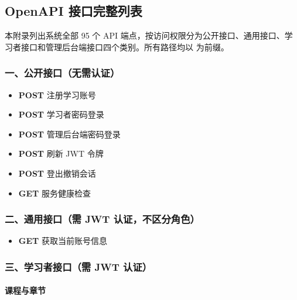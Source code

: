 \begin{appendices}
\chapter{OpenAPI 接口完整列表}

本附录列出系统全部 95 个 API 端点，按访问权限分为公开接口、通用接口、学习者接口和管理后台端接口四个类别。所有路径均以  为前缀。

\subsection*{一、公开接口（无需认证）}

\begin{itemize}
  \item \textbf{POST}  \hfill 注册学习账号
  \item \textbf{POST}  \hfill 学习者密码登录
  \item \textbf{POST}  \hfill 管理后台端密码登录
  \item \textbf{POST}  \hfill 刷新 JWT 令牌
  \item \textbf{POST}  \hfill 登出撤销会话
  \item \textbf{GET}  \hfill 服务健康检查
\end{itemize}

\subsection*{二、通用接口（需 JWT 认证，不区分角色）}

\begin{itemize}
  \item \textbf{GET}  \hfill 获取当前账号信息
\end{itemize}

\subsection*{三、学习者接口（需 JWT 认证）}

\subsubsection*{课程与章节}


\end{appendices}
